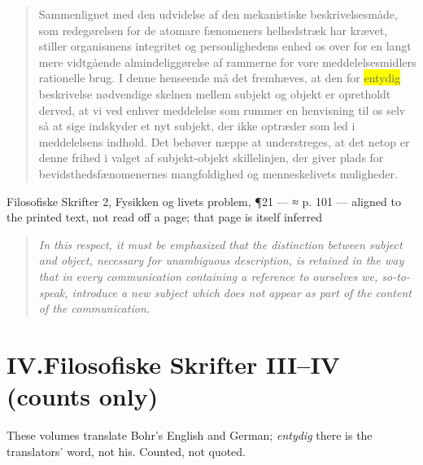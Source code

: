\documentclass[11pt]{article}
\newcommand{\dcite}[1]{{\nopagebreak\raggedleft\small #1\par}\medskip}
\newcommand{\tlg}[1]{{\setlength{\fboxsep}{0.8pt}\colorbox{yellow}{#1}}}
\newcommand{\olg}[1]{{\setlength{\fboxsep}{0.8pt}\colorbox{cyan!25}{#1}}}
\begin{document}
\begin{quote}
Sammenlignet med den udvidelse af den mekanistiske beskrivelsesmåde, som redegørelsen for de atomare fænomeners helhedstræk har krævet, stiller organismens integritet og personlighedens enhed os over for en langt mere vidtgående almindeliggørelse af rammerne for vore meddelelsesmidlers rationelle brug. I denne henseende må det fremhæves, at den for \tlg{entydig} beskrivelse nødvendige skelnen mellem subjekt og objekt er opretholdt derved, at vi ved enhver meddelelse som rummer en henvisning til os selv så at sige indskyder et nyt subjekt, der ikke optræder som led i meddelelsens indhold. Det behøver næppe at understreges, at det netop er denne frihed i valget af subjekt-objekt skillelinjen, der giver plads for bevidsthedsfænomenernes mangfoldighed og menneskelivets muligheder.
\end{quote}
\dcite{Filosofiske Skrifter 2, Fysikken og livets problem, ¶21 — ≈ p. 101 — aligned to the printed text, not read off a page; that page is itself inferred}
{\footnotesize\begin{quote}\itshape
In this respect, it must be emphasized that the distinction between subject and object, necessary for \olg{unambiguous} description, is retained in the way that in every communication containing a reference to ourselves we, so-to-speak, introduce a new subject which does not appear as part of the content of the communication.
\end{quote}}

\part*{IV.\quad Filosofiske Skrifter III--IV (counts only)}

\noindent These volumes translate Bohr's English and German; \emph{entydig} there is the translators' word, not his. Counted, not quoted.
\end{document}
